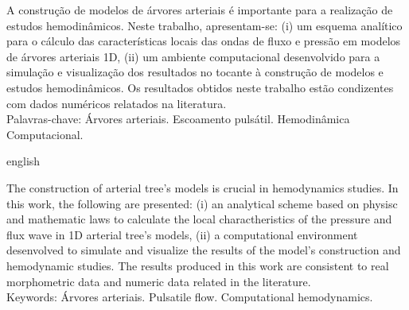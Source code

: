 \documentclass[
        english,			
        brazil			        %
        ,<...>]{abntbibufjf}
\begin{document}

\begin{resumo}

A construção de modelos de árvores arteriais é importante para a realização de estudos hemodinâmicos. Neste trabalho, apresentam-se: (i) um esquema analítico para o cálculo das características locais das ondas de fluxo e pressão em modelos de árvores arteriais 1D, (ii) um ambiente computacional desenvolvido para a simulação e visualização dos resultados no tocante à construção de modelos e estudos hemodinâmicos. Os resultados obtidos neste trabalho estão condizentes com dados numéricos relatados na literatura. \\[18pt]
Palavras-chave: Árvores arteriais. Escoamento pulsátil. Hemodinâmica Computacional. %
\end{resumo}
 
 
\begin{resumo}[ABSTRACT]
 \begin{otherlanguage*}{english}

The construction of arterial tree's models is crucial in hemodynamics studies. In this work, the following are presented: (i) an analytical scheme based on physisc and mathematic laws to calculate the local charactheristics of the pressure and flux wave in 1D arterial tree's models, (ii) a computational environment desenvolved to simulate and visualize the results of the model's construction and hemodynamic studies. The results produced in this work are consistent to real morphometric data and numeric data related in the literature. \\[18pt]
Keywords: Árvores arteriais. Pulsatile flow. Computational hemodynamics. %
 \end{otherlanguage*}
\end{resumo}




\ilustvaria   %
\listilustvaria  %
\end{document}
